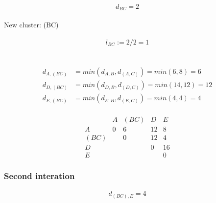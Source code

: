 \paragraph{\stepone}
\[
d_{BC} = 2
\]
\paragraph*{\steptwo}
New cluster: (BC) 
\paragraph*{\stepthree}
\[l_{BC} := 2 /2 = 1\] \\
\begin{center}
\end{center}
\paragraph*{\stepfour}
\begin{align*}
    d_{A, (BC)} & = min(d_{A,B}, d_{(A,C)}) = min (6,8) = 6 \\
    d_{D, (BC)} & = min(d_{D,B}, d_{(D,C)}) = min (14,12) = 12 \\
    d_{E, (BC)} & = min(d_{E,B}, d_{(E,C)}) = min (4,4) = 4 
\end{align*}
\paragraph*{\stepfive}
\[
\begin{array}{c|ccccc}
  & A & (BC) & D & E \\
\hline
A & 0& 6 & 12& 8 \\
(BC) &  & 0 & 12 & 4 \\
D &  &   & 0 & 16 \\
E &  &   &   & 0
\end{array}
\]
\subsubsection*{Second interation}
\paragraph*{\stepone}
\[d_{(BC),E} = 4\]

